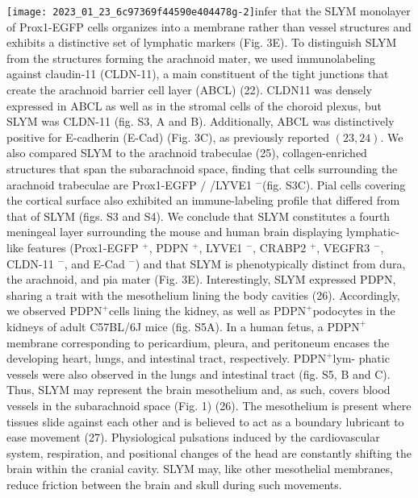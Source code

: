 \texttt{[image: 2023\_01\_23\_6c97369f44590e404478g-2]}infer that the SLYM monolayer of Prox1-EGFP cells organizes into a membrane rather than vessel structures and exhibits a distinctive set of lymphatic markers (Fig. 3E). To distinguish SLYM from the structures forming the arachnoid mater, we used immunolabeling against claudin-11 (CLDN-11), a main constituent of the tight junctions that create the arachnoid barrier cell layer (ABCL) (22). CLDN11 was densely expressed in ABCL as well as in the stromal cells of the choroid plexus, but SLYM was CLDN-11 (fig. S3, A and B). Additionally, ABCL was distinctively positive for E-cadherin (E-Cad) (Fig. 3C), as previously reported $(23,24)$. We also compared SLYM to the arachnoid trabeculae (25), collagen-enriched structures that span the subarachnoid space, finding that cells surrounding the arachnoid trabeculae are Prox1-EGFP $/$ /LYVE1 $^{-}$(fig. S3C). Pial cells covering the cortical surface also exhibited an immune-labeling profile that differed from that of SLYM (figs. S3 and S4). We conclude that SLYM constitutes a fourth meningeal layer surrounding the mouse and human brain displaying lymphatic-like features (Prox1-EGFP ${ }^{+}$, PDPN $^{+}$, LYVE1 ${ }^{-}$, CRABP2 ${ }^{+}$, VEGFR3 $^{-}$, CLDN-11 $^{-}$, and E-Cad ${ }^{-}$) and that SLYM is phenotypically distinct from dura, the arachnoid, and pia mater (Fig. 3E). Interestingly, SLYM expressed PDPN, sharing a trait with the mesothelium lining the body cavities (26). Accordingly, we observed $\mathrm{PDPN}^{+}$cells lining the kidney, as well as $\mathrm{PDPN}^{+}$podocytes in the kidneys of adult C57BL/6J mice (fig. S5A). In a human fetus, a $\mathrm{PDPN}^{+}$membrane corresponding to pericardium, pleura, and peritoneum encases the developing heart, lungs, and intestinal tract, respectively. $\mathrm{PDPN}^{+}$lym- phatic vessels were also observed in the lungs and intestinal tract (fig. S5, B and C). Thus, SLYM may represent the brain mesothelium and, as such, covers blood vessels in the subarachnoid space (Fig. 1) (26). The mesothelium is present where tissues slide against each other and is believed to act as a boundary lubricant to ease movement (27). Physiological pulsations induced by the cardiovascular system, respiration, and positional changes of the head are constantly shifting the brain within the cranial cavity. SLYM may, like other mesothelial membranes, reduce friction between the brain and skull during such movements.


